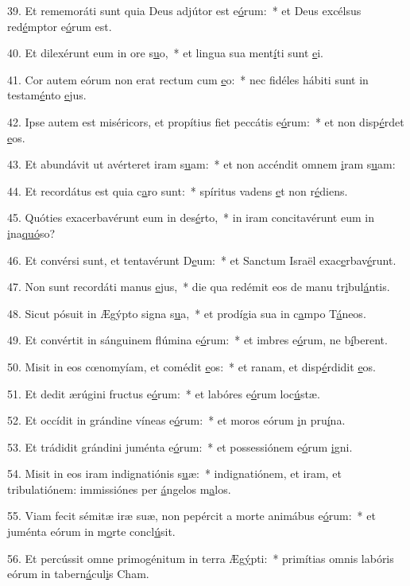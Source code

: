 39. Et rememoráti sunt quia Deus adjútor est e\uline{ó}rum:~* et Deus excélsus red\uline{é}mptor e\uline{ó}rum est.\par 
40. Et dilexérunt eum in ore s\uline{u}o,~* et lingua sua ment\uline{í}ti sunt \uline{e}i.\par 
41. Cor autem eórum non erat rectum cum \uline{e}o:~* nec fidéles hábiti sunt in testam\uline{é}nto \uline{e}jus.\par 
42. Ipse autem est miséricors, et propítius fiet peccátis e\uline{ó}rum:~* et non disp\uline{é}rdet \uline{e}os.\par 
43. Et abundávit ut avérteret iram s\uline{u}am:~* et non accéndit omnem \uline{i}ram s\uline{u}am:\par 
44. Et recordátus est quia c\uline{a}ro sunt:~* spíritus vadens \uline{e}t non r\uline{é}diens.\par 
45. Quóties exacerbavérunt eum in des\uline{é}rto,~* in iram concitavérunt eum in \uline{i}na\uline{quó}so?\par 
46. Et convérsi sunt, et tentavérunt D\uline{e}um:~* et Sanctum Israël exac\uline{e}rbav\uline{é}runt.\par 
47. Non sunt recordáti manus \uline{e}jus,~* die qua redémit eos de manu tr\uline{i}bul\uline{á}ntis.\par 
48. Sicut pósuit in Ægýpto signa s\uline{u}a,~* et prodígia sua in c\uline{a}mpo T\uline{á}neos.\par 
49. Et convértit in sánguinem flúmina e\uline{ó}rum:~* et imbres e\uline{ó}rum, ne b\uline{í}berent.\par 
50. Misit in eos cœnomyíam, et comédit \uline{e}os:~* et ranam, et disp\uline{é}rdidit \uline{e}os.\par 
51. Et dedit ærúgini fructus e\uline{ó}rum:~* et labóres e\uline{ó}rum loc\uline{ú}stæ.\par 
52. Et occídit in grándine víneas e\uline{ó}rum:~* et moros eórum \uline{i}n pru\uline{í}na.\par 
53. Et trádidit grándini juménta e\uline{ó}rum:~* et possessiónem e\uline{ó}rum \uline{i}gni.\par 
54. Misit in eos iram indignatiónis s\uline{u}æ:~* indignatiónem, et iram, et tribulatiónem: immissiónes per \uline{á}ngelos m\uline{a}los.\par 
55. Viam fecit sémitæ iræ suæ, non pepércit a morte animábus e\uline{ó}rum:~* et juménta eórum in m\uline{o}rte concl\uline{ú}sit.\par 
56. Et percússit omne primogénitum in terra Æg\uline{ý}pti:~* primítias omnis labóris eórum in tabern\uline{á}cul\uline{i}s Cham.\par 
